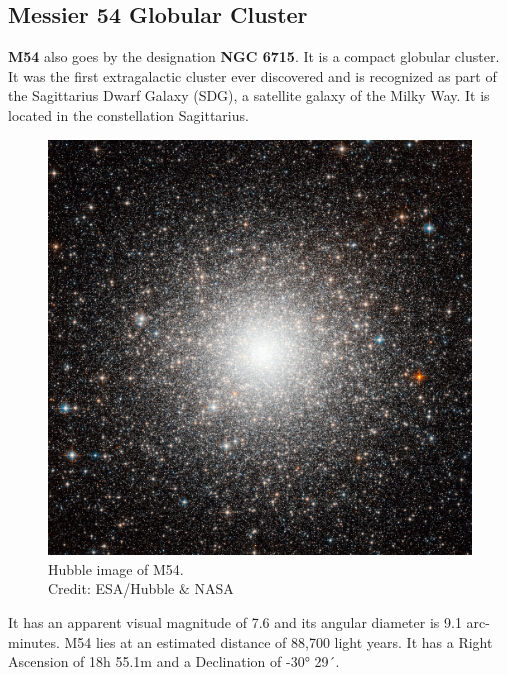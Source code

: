 \documentclass[12pt, twocolumn]{aastex62}
\begin{document}
\subsection{Messier 54 Globular Cluster}
\textbf{M54} also goes by the designation \textbf{NGC 6715}. It is a compact globular cluster.\\
It was the first extragalactic cluster ever discovered and is recognized as part of the Sagittarius Dwarf Galaxy (SDG), a satellite galaxy of the Milky Way\cite{nasa_m54}. It is located in the constellation Sagittarius.
\begin{figure}
	\includegraphics[scale=0.2]{m54_esa_nasa_hubble_0}
	\caption{Hubble image of M54. \cite{esahubble_images}\\Credit: ESA/Hubble $\&$ NASA}
	\label{fig: m54}
\end{figure}
It has an apparent visual magnitude of 7.6 and its angular diameter is 9.1 arc-minutes. M54 lies at an estimated distance of 88,700 light years. It has a Right Ascension of 18h 55.1m and a Declination of -30° 29´.
\end{document}
